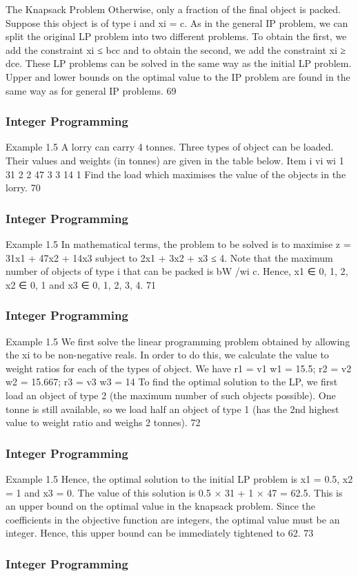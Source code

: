 \begin{frame}
The Knapsack Problem
Otherwise, only a fraction of the final object is packed.
Suppose this object is of type i and xi = c. As in the general IP
problem, we can split the original LP problem into two different
problems. To obtain the first, we add the constraint xi ≤ bcc and
to obtain the second, we add the constraint xi ≥ dce.
These LP problems can be solved in the same way as the initial LP
problem.
Upper and lower bounds on the optimal value to the IP problem
are found in the same way as for general IP problems.
69 \end{frame}  \begin{frame} \frametitle{Integer Programming}     
Example 1.5
A lorry can carry 4 tonnes. Three types of object can be loaded.
Their values and weights (in tonnes) are given in the table below.
Item i vi wi
1 31 2
2 47 3
3 14 1
Find the load which maximises the value of the objects in the lorry.
70 \end{frame}  \begin{frame} \frametitle{Integer Programming}     
Example 1.5
In mathematical terms, the problem to be solved is to maximise
z = 31x1 + 47x2 + 14x3
subject to
2x1 + 3x2 + x3 ≤ 4.
Note that the maximum number of objects of type i that can be
packed is bW /wi c.
Hence, x1 ∈ {0, 1, 2}, x2 ∈ {0, 1} and x3 ∈ {0, 1, 2, 3, 4}.
71 \end{frame}  \begin{frame} \frametitle{Integer Programming}     
Example 1.5
We first solve the linear programming problem obtained by
allowing the xi to be non-negative reals.
In order to do this, we calculate the value to weight ratios for each
of the types of object. We have
r1 =
v1
w1
= 15.5; r2 =
v2
w2
= 15.667; r3 =
v3
w3
= 14
To find the optimal solution to the LP, we first load an object of
type 2 (the maximum number of such objects possible).
One tonne is still available, so we load half an object of type 1 (has
the 2nd highest value to weight ratio and weighs 2 tonnes).
72 \end{frame}  \begin{frame} \frametitle{Integer Programming}     
Example 1.5
Hence, the optimal solution to the initial LP problem is x1 = 0.5,
x2 = 1 and x3 = 0.
The value of this solution is 0.5 × 31 + 1 × 47 = 62.5.
This is an upper bound on the optimal value in the knapsack
problem.
Since the coefficients in the objective function are integers, the
optimal value must be an integer. Hence, this upper bound can be
immediately tightened to 62.
73 \end{frame}  \begin{frame} \frametitle{Integer Programming}     

\end{frame}
